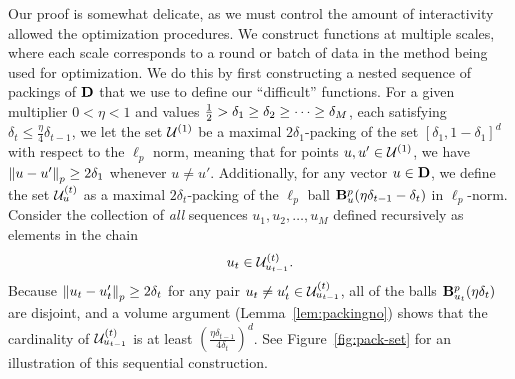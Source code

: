 Our proof is somewhat delicate, as we must control the amount of
interactivity allowed the optimization procedures.  We construct functions
at multiple scales, where each scale corresponds to a round or batch of data
in the method being used for optimization. We do this by first constructing
a nested sequence of packings of $\mathbf{D}$ that we use to define our
``difficult'' functions. For a given multiplier $0 < \eta < 1$ and values
$\frac{1}{2} > \delta_1 \ge \delta_2 \ge \cdots \ge \delta_M$, each satisfying
$\delta_t \le \frac{\eta}{4} \delta_{t - 1}$, we let the set $\mathcal{U}^{(1)}$ be a
maximal $2\delta_1$-packing of the set $[\delta_1, 1 - \delta_1]^d$ with
respect to the $\ell_p$ norm, meaning that for points $u, u' \in \mathcal{U}^{(1)}$, we
have $\left\|{u - u'}\right\|_p \ge 2\delta_1$ whenever $u \neq u'$.  Additionally, for
any vector $u \in \mathbf{D}$, we define the set $\mathcal{U}_u^{(t)}$ as a maximal
$2\delta_t$-packing of the $\ell_p$ ball $\mathbf{B}^p_{u}({\eta \delta_{t- 1} -
  \delta_t})$ in $\ell_p$-norm. Consider the collection of \emph{all} sequences
$u_1, u_2, \ldots, u_M$ defined recursively as elements in the chain
\begin{equation}
  \label{eqn:defining-sequence-of-u}
  u_t \in \mathcal{U}^{(t)}_{u_{t-1}}.
\end{equation}
Because $\left\|{u_t - u_t'}\right\|_p \ge 2 \delta_t$ for any pair $u_t \neq u_t' \in
\mathcal{U}^{(t)}_{u_{t-1}}$, all of the balls $\mathbf{B}^p_{u_t}({\eta \delta_{t}})$ are disjoint, and a volume argument (Lemma~\ref{lem:packingno}) shows that the
cardinality of $\mathcal{U}^{(t)}_{u_{t-1}}$ is at least $(\frac{\eta \delta_{t - 1}}{4 \delta_{t}})^d$.
See Figure~\ref{fig:pack-set} for an illustration of this
sequential construction.


